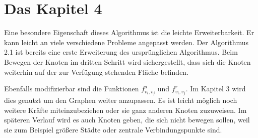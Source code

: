 
\chapter{Das Kapitel 4}
\label{Kapitel 4}
%


Eine besondere Eigenschaft dieses Algorithmus ist die leichte Erweiterbarkeit. Er kann leicht an viele verschiedene Probleme angepasst werden.
Der Algorithmus 2.1 ist bereits eine erste Erweiterung des ursprünglichen Algorithmus. Beim Bewegen der Knoten im dritten Schritt wird sichergestellt, dass sich die Knoten weiterhin auf der zur Verfügung stehenden Fläche befinden.

Ebenfalls modifizierbar sind die Funktionen $f^{a}_{v_{i},v_{j}}$ und $f^{r}_{v_{i},v_{j}}$. Im Kapitel 3 wird dies genutzt um den Graphen weiter anzupassen. Es ist leicht möglich noch weitere Kräfte miteinzubeziehen oder sie ganz anderen Knoten zuzuweisen. Im späteren Verlauf wird es auch Knoten geben, die sich nicht bewegen sollen, weil sie zum Beispiel größere Städte oder zentrale Verbindungspunkte sind.
